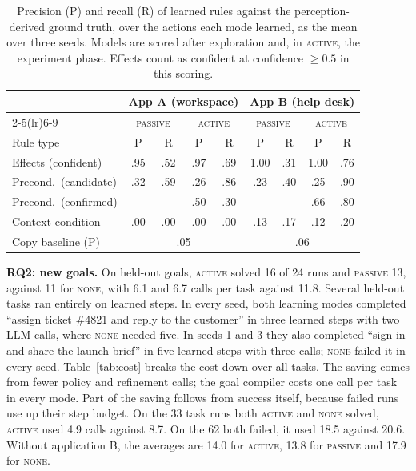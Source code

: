 \documentclass[conference]{IEEEtran}
\newcommand{\modeNone}{\textsc{none}}
\newcommand{\modePassive}{\textsc{passive}}
\newcommand{\modeActive}{\textsc{active}}
\begin{document}
\begin{table}[t]
\centering
\caption{Precision (P) and recall (R) of learned rules against the perception-derived ground truth, over the actions each mode learned, as the mean over three seeds. Models are scored after exploration and, in \modeActive{}, the experiment phase. Effects count as confident at confidence $\ge 0.5$ in this scoring.}
\label{tab:rules}
\footnotesize
\setlength{\tabcolsep}{3.2pt}
\begin{tabular}{l cc cc cc cc}
\toprule
& \multicolumn{4}{c}{App A (workspace)} & \multicolumn{4}{c}{App B (help desk)} \\
\cmidrule(lr){2-5}\cmidrule(lr){6-9}
& \multicolumn{2}{c}{\modePassive} & \multicolumn{2}{c}{\modeActive} & \multicolumn{2}{c}{\modePassive} & \multicolumn{2}{c}{\modeActive} \\
Rule type & P & R & P & R & P & R & P & R \\
\midrule
Effects (confident)       & .95 & .52 & .97 & .69 & 1.00 & .31 & 1.00 & .76 \\
Precond.\ (candidate)     & .32 & .59 & .26 & .86 & .23 & .40 & .25 & .90 \\
Precond.\ (confirmed)     & --  & --  & .50 & .30 & --  & --  & .66 & .80 \\
Context condition         & .00 & .00 & .00 & .00 & .13 & .17 & .12 & .20 \\
\midrule
Copy baseline (P)         & \multicolumn{4}{c}{.05} & \multicolumn{4}{c}{.06} \\
\bottomrule
\end{tabular}
\end{table}

\textbf{RQ2: new goals.} %
On held-out goals, \modeActive{} solved 16 of 24 runs and \modePassive{} 13, against 11 for \modeNone{}, with 6.1 and 6.7 calls per task against 11.8. Several held-out tasks ran entirely on learned steps. In every seed, both learning modes completed ``assign ticket \#4821 and reply to the customer'' in three learned steps with two LLM calls, where \modeNone{} needed five. In seeds 1 and 3 they also completed ``sign in and share the launch brief'' in five learned steps with three calls; \modeNone{} failed it in every seed. Table~\ref{tab:cost} breaks the cost down over all tasks. The saving comes from fewer policy and refinement calls; the goal compiler costs one call per task in every mode. Part of the saving follows from success itself, because failed runs use up their step budget. On the 33 task runs both \modeActive{} and \modeNone{} solved, \modeActive{} used 4.9 calls against 8.7. On the 62 both failed, it used 18.5 against 20.6. Without application B, the averages are 14.0 for \modeActive{}, 13.8 for \modePassive{} and 17.9 for \modeNone{}.
\end{document}
